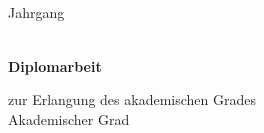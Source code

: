 ﻿%
\begin{titlepage}
	\thispagestyle{empty}
	\setcounter{page}{-2}

\begin{center}
	\hspace{1cm}
\vfill

\begin{minipage}{0.99\textwidth}
\begin{center}
\onehalfspacing
\Huge \textsf{\textbf{\mytitle}}
\end{center}
\end{minipage}

\vfill
	\hspace{1cm} \\ \vspace{2em}
\vfill
	\hspace{1cm} \\ \vspace{2em}
\vfill

\textbf{\textsf{\LARGE{%
\myauthor \\
\mypaper \\
}}}%

\vspace{1em}
\LARGE{%
Jahrgang \myclass \\
}%

\end{center}

	\newpage
	\thispagestyle{empty}
	\hspace{1cm}
	\newpage
	\thispagestyle{empty}
\begin{center}

\vfill

\begin{minipage}{0.99\textwidth}
\begin{center}
\onehalfspacing
\Huge \textsf{\textbf{\mytitle}}
\end{center}
\end{minipage}

\vfill

{\LARGE \textsf{\textbf{\\ Diplomarbeit}}}

\large
zur Erlangung des akademischen Grades \\
Akademischer Grad


\end{center}
\end{titlepage}
